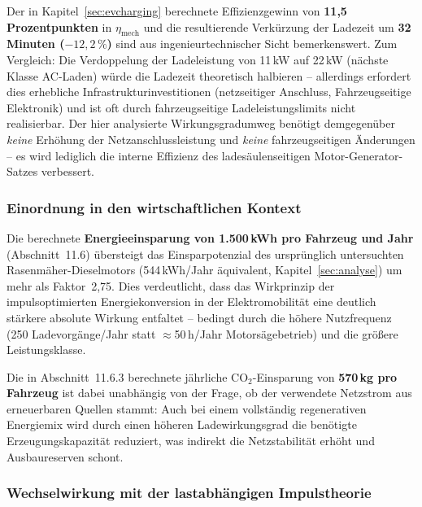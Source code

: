 ﻿\documentclass[a4paper,12pt]{article}
\begin{document}
Der in Kapitel~\ref{sec:evcharging} berechnete Effizienzgewinn von
\textbf{11{,}5 Prozentpunkten} in $\eta_\text{mech}$ und die resultierende
Verkürzung der Ladezeit um \textbf{32 Minuten ($-12{,}2\,\%$)} sind aus
ingenieurtechnischer Sicht bemerkenswert. Zum Vergleich: Die
Verdoppelung der Ladeleistung von 11\,kW auf 22\,kW (nächste Klasse AC-Laden)
würde die Ladezeit theoretisch halbieren -- allerdings erfordert dies
erhebliche Infrastrukturinvestitionen (netzseitiger Anschluss, Fahrzeugseitige
Elektronik) und ist oft durch fahrzeugseitige Ladeleistungslimits nicht
realisierbar. Der hier analysierte Wirkungsgradumweg benötigt demgegenüber
\textit{keine} Erhöhung der Netzanschlussleistung und \textit{keine}
fahrzeugseitigen Änderungen -- es wird lediglich die interne Effizienz
des ladesäulenseitigen Motor-Generator-Satzes verbessert.

\subsubsection*{Einordnung in den wirtschaftlichen Kontext}

Die berechnete \textbf{Energieeinsparung von 1.500\,kWh pro Fahrzeug und Jahr}
(Abschnitt~11.6) übersteigt das Einsparpotenzial des ursprünglich untersuchten
Rasenmäher-Dieselmotors (544\,kWh/Jahr äquivalent, Kapitel~\ref{sec:analyse})
um mehr als Faktor~2{,}75. Dies verdeutlicht, dass das Wirkprinzip der
impulsoptimierten Energiekonversion in der Elektromobilität eine deutlich
stärkere absolute Wirkung entfaltet -- bedingt durch die höhere Nutzfrequenz
(250 Ladevorgänge/Jahr statt $\approx$50\,h/Jahr Motorsägebetrieb) und
die größere Leistungsklasse.

Die in Abschnitt~11.6.3 berechnete jährliche CO${}_2$-Einsparung von
\textbf{570\,kg pro Fahrzeug} ist dabei unabhängig von der Frage,
ob der verwendete Netzstrom aus erneuerbaren Quellen stammt: Auch bei
einem vollständig regenerativen Energiemix wird durch einen höheren
Ladewirkungsgrad die benötigte Erzeugungskapazität reduziert,
was indirekt die Netzstabilität erhöht und Ausbaureserven schont.

\subsubsection*{Wechselwirkung mit der lastabhängigen Impulstheorie}
\end{document}
